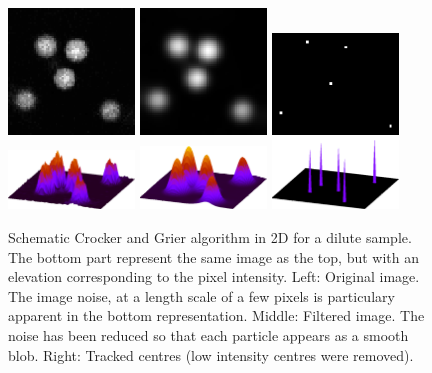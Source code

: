 \begin{figure}
	\centering
	\includegraphics[width=0.3\textwidth]{dillute_raw}
	\includegraphics[width=0.3\textwidth]{dillute_filtered}
	\includegraphics[width=0.3\textwidth]{dillute_centers}\\
	\includegraphics[width=0.3\textwidth]{dillute_raw_gp_raster}
	\includegraphics[width=0.3\textwidth]{dillute_filtered_gp_raster}
	\includegraphics[width=0.3\textwidth]{dillute_centers_gp_raster}
\caption{Schematic Crocker and Grier algorithm in 2D for a dilute sample. The bottom part represent the same image as the top, but with an elevation corresponding to the pixel intensity. Left: Original image. The image noise, at a length scale of a few pixels is particulary apparent in the bottom representation. Middle: Filtered image. The noise has been reduced so that each particle appears as a smooth blob. Right: Tracked centres (low intensity centres were removed).}
\label{fig:track2D}
\end{figure}

